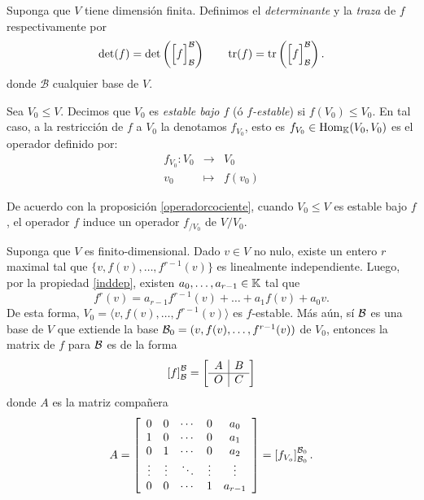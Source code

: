 \begin{defn}
Suponga que $V$ tiene dimensi\'on finita. Definimos el \emph{determinante} y la \emph{traza} de $f$ respectivamente por
\[
\det(f)=\det\left(\Big[f\Big]^{\mathcal{B}}_{\mathcal{B}}\right)\qquad \operatorname{tr}(f)=\operatorname{tr}\left(\Big[f\Big]^{\mathcal{B}}_{\mathcal{B}}\right).
\]
donde $\mathcal{B}$ cualquier base de $V$.
\end{defn}

\begin{defn}
Sea $V_0\le V$. Decimos que $V_0$ es \emph{estable bajo $f$} (ó \emph{$f$-estable}) si $f(V_0)\le V_0$. En tal caso, a la restricci\'on de $f$ a $V_0$ la denotamos $f_{V_0}$, esto es $f_{V_0}\in\operatorname{Hom}_\mathbb{K}(V_0,V_0)$ es el operador definido por:
\begin{eqnarray*}
f_{V_0}: V_0 & \longrightarrow & V_0\\
 v_0 & \longmapsto & f(v_0)
\end{eqnarray*}
\end{defn}

\begin{obs}
  De acuerdo con la proposición \ref{operadorcociente}, cuando $V_0\le V$ es estable bajo $f$, el operador $f$ induce un operador $f_{/V_0}$ de $V/V_0$.
\end{obs}

\begin{obs}\label{festablecompa}
  Suponga que $V$ es finito-dimensional. Dado $v\in V$ no nulo, existe un entero $r$ maximal tal que $\{v,f(v),\ldots,f^{r-1}(v)\}$ es linealmente independiente. Luego, por la propiedad \ref{inddep}, existen $a_0,\ldots,a_{r-1}\in\mathbb{K}$ tal que
  $$f^r(v)=a_{r-1}f^{r-1}(v)+\ldots+a_{1}f(v)+a_0v.$$
De esta forma, $V_0=\langle v,f(v),\ldots,f^{r-1}(v)\rangle$ es $f$-estable. Más aún, sí $\mathcal{B}$ es una base de $V$ que extiende la base $\mathcal{B}_0=(v,f(v),\ldots,f^{r-1}(v))$ de $V_0$, entonces la matrix de $f$ para $\mathcal{B}$ es de la forma
  $$
    \left[f\right]_{\mathcal{B}}^{\mathcal{B}}=\left[\begin{array}{c|c}
      A & B\\
      \hline
      O & C
    \end{array}\right]
  $$
donde $A$ es la matriz compañera
  $$
  A=\left[\begin{array}{ccccc}
    0 & 0 & \cdots & 0 & a_0\\
    1 & 0 & \cdots & 0 & a_1\\
    0 & 1 & \cdots & 0 & a_2\\
    \vdots & \vdots & \ddots & \vdots & \vdots\\
    0 & 0 & \cdots & 1 & a_{r-1}
  \end{array}\right]=\left[f_{V_o}\right]_{\mathcal{B}_0}^{\mathcal{B}_0}.
  $$
\end{obs}

